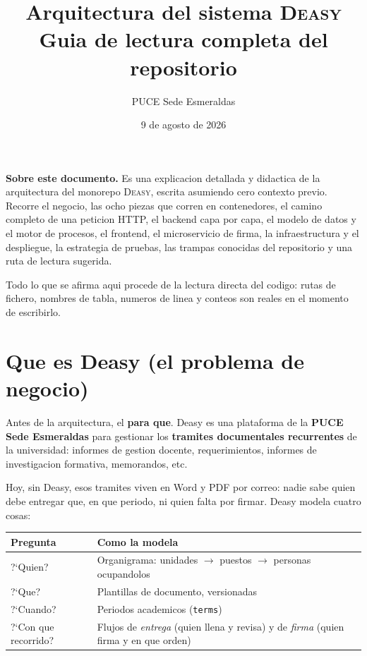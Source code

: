 \documentclass[11pt,a4paper,oneside]{report}
\title{\Huge\bfseries Arquitectura del sistema \textsc{Deasy}\\[0.4cm]
       \large Guia de lectura completa del repositorio}
\author{PUCE Sede Esmeraldas}
\date{9 de agosto de 2026}
\newcommand{\rt}[1]{\texttt{#1}}
\begin{document}
\maketitle

\begin{center}
\begin{minipage}{0.85\textwidth}
\small
\textbf{Sobre este documento.} Es una explicacion detallada y didactica de la arquitectura
del monorepo \textsc{Deasy}, escrita asumiendo cero contexto previo. Recorre el negocio,
las ocho piezas que corren en contenedores, el camino completo de una peticion HTTP, el
backend capa por capa, el modelo de datos y el motor de procesos, el frontend, el
microservicio de firma, la infraestructura y el despliegue, la estrategia de pruebas, las
trampas conocidas del repositorio y una ruta de lectura sugerida.

Todo lo que se afirma aqui procede de la lectura directa del codigo: rutas de fichero,
nombres de tabla, numeros de linea y conteos son reales en el momento de escribirlo.
\end{minipage}
\end{center}

\vfill
\tableofcontents
\clearpage
{}

\chapter{Que es Deasy (el problema de negocio)}

Antes de la arquitectura, el \textbf{para que}. Deasy es una plataforma de la
\textbf{PUCE Sede Esmeraldas} para gestionar los \textbf{tramites documentales recurrentes}
de la universidad: informes de gestion docente, requerimientos, informes de investigacion
formativa, memorandos, etc.

Hoy, sin Deasy, esos tramites viven en Word y PDF por correo: nadie sabe quien debe
entregar que, en que periodo, ni quien falta por firmar. Deasy modela cuatro cosas:

\begin{center}
\begin{tabularx}{\textwidth}{@{}P{3.2cm}L@{}}
\toprule
\textbf{Pregunta} & \textbf{Como la modela} \\
\midrule
?`Quien?           & Organigrama: unidades $\rightarrow$ puestos $\rightarrow$ personas ocupandolos \\
?`Que?             & Plantillas de documento, versionadas \\
?`Cuando?          & Periodos academicos (\rt{terms}) \\
?`Con que recorrido? & Flujos de \emph{entrega} (quien llena y revisa) y de \emph{firma} (quien firma y en que orden) \\
\bottomrule
\end{tabularx}
\end{center}
\end{document}
